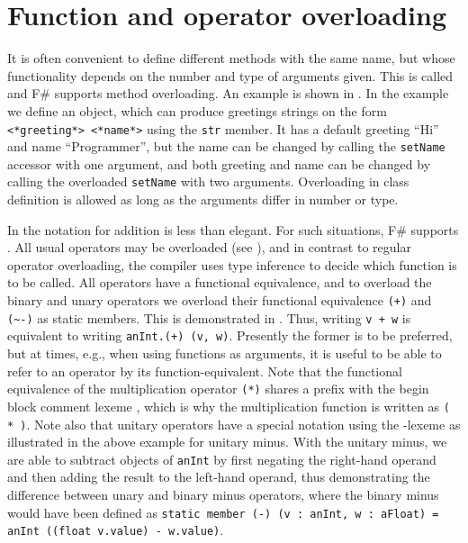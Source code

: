 \section{Function and operator overloading}
It is often convenient to define different methods with the same name, but whose functionality depends on the number and type of arguments given. This is called  and F\# supports method overloading. An example is shown in .
%
% 
In the example we define an object, which can produce greetings strings on the form \lstinline[language=syntax]{<*greeting*> <*name*>} using the \lstinline{str} member. It has a default greeting ``Hi'' and name ``Programmer'', but the name can be changed by calling the \lstinline{setName} accessor with one argument, and both greeting and name can be changed by calling the overloaded \lstinline{setName} with two arguments. Overloading in class definition is allowed as long as the arguments differ in number or type.

In  the notation for addition is less than elegant. For such situations, F\# supports . All usual operators may be overloaded (see ), and in contrast to regular operator overloading, the compiler uses type inference to decide which function is to be called. All operators have a functional equivalence, and to overload the binary \lexeme{+} and unary \lexeme{-} operators we overload their functional equivalence \lstinline{(+)} and \lstinline{(~-)} as static members. This is demonstrated in .
%
% 
Thus, writing \lstinline{v + w} is equivalent to writing \lstinline{anInt.(+) (v, w)}. Presently the former is to be preferred, but at times, e.g., when using functions as arguments, it is useful to be able to refer to an operator by its function-equivalent. Note that the functional equivalence of the multiplication operator \lstinline{(*)} shares a  prefix with the begin block comment lexeme \lexeme{(*}, which is why the multiplication function is written as \lstinline{( * )}. Note also that unitary operators have a special notation using the \lexeme{\~}-lexeme as illustrated in the above example for unitary minus. With the unitary minus, we are able to subtract objects of \lstinline{anInt} by first negating the right-hand operand and then adding the result to the left-hand operand, thus demonstrating the difference between unary and binary minus operators, where the binary minus would have been defined as \lstinline{static member (-) (v : anInt, w : aFloat) = anInt ((float v.value) - w.value)}.

